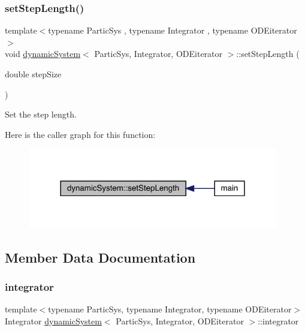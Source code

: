 \subsubsection{\texorpdfstring{set\+Step\+Length()}{setStepLength()}}
{\footnotesize\ttfamily template$<$typename Partic\+Sys , typename Integrator , typename O\+D\+Eiterator $>$ \\
void \mbox{\hyperlink{classdynamic_system}{dynamic\+System}}$<$ Partic\+Sys, Integrator, O\+D\+Eiterator $>$\+::set\+Step\+Length (\begin{DoxyParamCaption}\item[{double}]{step\+Size }\end{DoxyParamCaption})}



Set the step length. 

Here is the caller graph for this function\+:
\nopagebreak
\begin{figure}[H]
\begin{center}
\leavevmode
\includegraphics[width=310pt]{classdynamic_system_af1b1ccfa965c677bd66029b42377117d_icgraph}
\end{center}
\end{figure}


\subsection{Member Data Documentation}
\mbox{\label{classdynamic_system_adf34beb841273d743821fd2df47e0aab}} 
\subsubsection{\texorpdfstring{integrator}{integrator}}
{\footnotesize\ttfamily template$<$typename Partic\+Sys, typename Integrator, typename O\+D\+Eiterator$>$ \\
Integrator \mbox{\hyperlink{classdynamic_system}{dynamic\+System}}$<$ Partic\+Sys, Integrator, O\+D\+Eiterator $>$\+::integrator}



